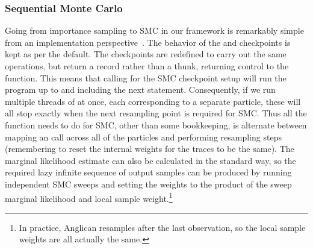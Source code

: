 \subsubsection{Sequential Monte Carlo}
\label{sec:proginf:str:part:smc}
\vspace{-5pt}
Going from importance sampling to SMC in our framework is remarkably simple
from an implementation perspective~\citep{wood2014new,paige2014compilation}.  The behavior of the \sample and  
checkpoints is kept as per the default.  
The \observe checkpoints are redefined
to carry out the same operations, but return a record rather
than a thunk, returning control to the \anginfer function.  This means that 
calling  for the SMC checkpoint setup will run the program up to and including
the next \observe statement.  Consequently, if we run multiple threads of  at
once, each corresponding to a separate particle, these will all stop exactly when
the next resampling point is required for SMC.  Thus all the \anginfer function needs
to do for SMC, other than some bookkeeping,
is alternate between mapping an  call across all of the particles and
performing resampling steps (remembering to reset the internal weights for the traces to
be the same).  The marginal likelihood estimate can also be calculated in
the standard way, so the required lazy infinite sequence
of output samples can be produced by running independent SMC sweeps and setting the weights
to the product of the sweep marginal likelihood and local sample weight.\footnote{In practice, Anglican
	resamples after the last observation, so the
	local sample weights are all actually the same.}

